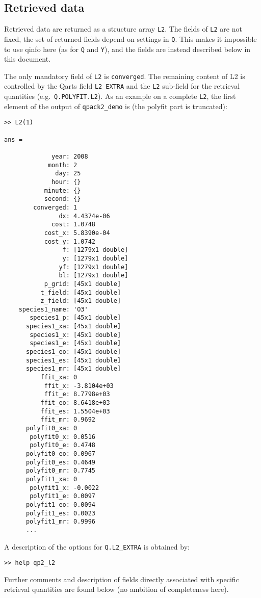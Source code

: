 \documentclass[a4paper,11pt]{article}
\begin{document}
\subsection{Retrieved data}
\label{sec:l2}
Retrieved data are returned as a structure array \verb|L2|. The fields of
\verb|L2| are not fixed, the set of returned fields depend on settings in
\verb|Q|. This makes it impossible to use qinfo here (as for \verb|Q| and
\verb|Y|), and the fields are instead described below in this document.

The only mandatory field of \verb|L2| is \verb|converged|. The remaining
content of L2 is controlled by the Qarts field \verb|L2_EXTRA| and the
\verb|L2| sub-field for the retrieval quantities (e.g.\ \verb|Q.POLYFIT.L2|).
As an example on a complete \verb|L2|, the first element of the output of
\verb|qpack2_demo| is (the polyfit part is truncated):
\begin{verbatim}
>> L2(1)

ans = 

             year: 2008
            month: 2
              day: 25
             hour: {}
           minute: {}
           second: {}
        converged: 1
               dx: 4.4374e-06
             cost: 1.0748
           cost_x: 5.8390e-04
           cost_y: 1.0742
                f: [1279x1 double]
                y: [1279x1 double]
               yf: [1279x1 double]
               bl: [1279x1 double]
           p_grid: [45x1 double]
          t_field: [45x1 double]
          z_field: [45x1 double]
    species1_name: 'O3'
       species1_p: [45x1 double]
      species1_xa: [45x1 double]
       species1_x: [45x1 double]
       species1_e: [45x1 double]
      species1_eo: [45x1 double]
      species1_es: [45x1 double]
      species1_mr: [45x1 double]
          ffit_xa: 0
           ffit_x: -3.8104e+03
           ffit_e: 8.7798e+03
          ffit_eo: 8.6418e+03
          ffit_es: 1.5504e+03
          ffit_mr: 0.9692
      polyfit0_xa: 0
       polyfit0_x: 0.0516
       polyfit0_e: 0.4748
      polyfit0_eo: 0.0967
      polyfit0_es: 0.4649
      polyfit0_mr: 0.7745
      polyfit1_xa: 0
       polyfit1_x: -0.0022
       polyfit1_e: 0.0097
      polyfit1_eo: 0.0094
      polyfit1_es: 0.0023
      polyfit1_mr: 0.9996
      ...
\end{verbatim}
A description of the options for \verb|Q.L2_EXTRA| is obtained by:
\begin{verbatim}
>> help qp2_l2
\end{verbatim}
Further comments and description of fields directly associated with specific
retrieval quantities are found below (no ambition of completeness here).
\end{document}
